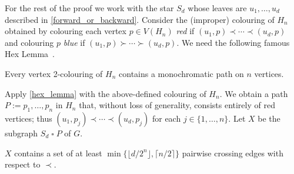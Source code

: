 \documentclass[kpfonts]{patmorin}
\newcommand{\CartProd}{\mathbin{\square}}
\begin{document}
For the rest of the proof we work with the star $S_d$ whose leaves are $u_1,\ldots,u_d$ described in \cref{forward_or_backward}.  Consider the (improper) colouring of $H_n$ obtained by colouring each vertex $p\in V(H_n)$ \emph{red} if $(u_1,p)\prec\cdots\prec (u_d,p)$ and colouring $p$ \emph{blue} if $(u_1,p)\succ\cdots\succ(u_d,p)$. We need the following famous Hex Lemma~\citep{Gale79}.

\begin{lem} \label{hex_lemma}
Every vertex 2-colouring of $H_n$ contains a monochromatic path on $n$ vertices.
\end{lem}


Apply \cref{hex_lemma} with the above-defined colouring of $H_n$. We obtain a path $P:=p_1,\ldots,p_n$ in $H_n$ that, without loss of generality, consists entirely of red vertices;
thus $(u_1,p_j)\prec\cdots\prec (u_d,p_j)$ for each $j\in\{1,\ldots,n\}$.  Let $X$ be the subgraph $S_d \CartProd P$ of $G$.

\begin{lem}\label{twister}
$X$ contains a set of at least $\min\{\lfloor d/2^{n}\rfloor,\lceil n/2\rceil\}$ pairwise crossing edges with respect to $\prec$.
\end{lem}
\end{document}
